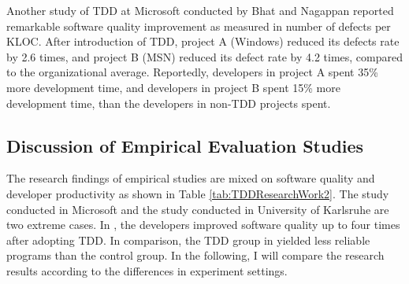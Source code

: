 Another study of TDD at Microsoft conducted by Bhat and Nagappan
\cite{Bhat:06} reported remarkable software quality improvement as 
measured in number of defects per KLOC. After introduction of TDD, 
project A (Windows) reduced its defects rate by 2.6 times, and project 
B (MSN) reduced its defect rate by 4.2 times, compared to the organizational
average. Reportedly, developers in project A spent 35\% more development
time, and developers in project B spent 15\% more development time, than
the developers in non-TDD projects spent.

\subsection{Discussion of Empirical Evaluation Studies}
The research findings of empirical studies are mixed on software quality 
and developer productivity as shown in Table \ref{tab:TDDResearchWork2}. 
The study conducted in Microsoft \cite{Bhat:06} and the study conducted 
in University of Karlsruhe \cite{Muller:02} are two extreme cases. In 
\cite{Bhat:06}, the developers improved software quality up to four 
times after adopting TDD. In comparison, the TDD group in \cite{Muller:02} 
yielded less reliable programs than the control group. In the following,
I will compare the research results according to the differences in
experiment settings. 

